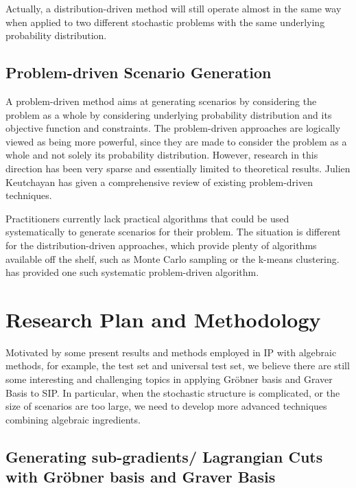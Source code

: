 \documentclass{article}
\theoremstyle{plain}
\theoremstyle{definition}
\begin{document}
Actually, a distribution-driven method will still operate almost in the same way when applied to two different stochastic problems with the same underlying probability distribution.

\subsection{Problem-driven Scenario Generation}

A problem-driven method aims at generating scenarios by considering the problem as a whole by considering underlying probability distribution and its objective function and constraints.  The problem-driven approaches are logically viewed as being more powerful, since they are made to consider the problem as a whole and not solely its probability distribution. However, research in this direction has been very sparse and essentially limited to theoretical results. Julien Keutchayan \cite{Scenario Clustering} has given a comprehensive review of existing problem-driven techniques.

Practitioners currently lack practical algorithms that could be used systematically to generate scenarios for their problem. The situation is different for the distribution-driven approaches, which provide plenty of algorithms available off the shelf, such as Monte Carlo sampling or the k-means clustering. \cite{Scenario Clustering} has provided one such systematic problem-driven algorithm.

\section{Research Plan and Methodology}

 Motivated by some present results and methods employed in IP with algebraic methods, for example, the test set and universal test set, we believe there are still some interesting and challenging topics in applying Gröbner basis and Graver Basis to SIP. In particular, when the stochastic structure is complicated, or the size of scenarios are too large, we need to develop more advanced techniques combining algebraic ingredients.


\subsection{Generating sub-gradients/ Lagrangian Cuts with Gröbner basis and Graver Basis}
\end{document}
